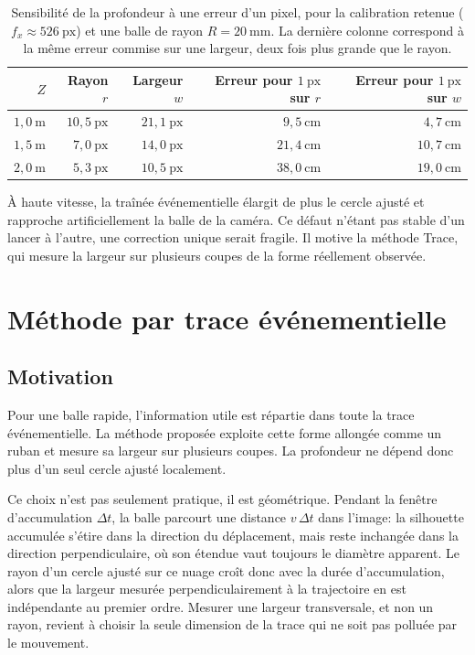 \documentclass[a4paper,11pt]{report}
\begin{document}
\begin{table}[H]
  \centering
  \caption{Sensibilité de la profondeur à une erreur d'un pixel, pour la calibration retenue (\(f_x \approx 526~\text{px}\)) et une balle de rayon \(R = 20~\text{mm}\). La dernière colonne correspond à la même erreur commise sur une largeur, deux fois plus grande que le rayon.}
  \label{tab:depth-sensitivity}
  \small
  \begin{tabular}{rrrrr}
    \toprule
    \(Z\) & Rayon \(r\) & Largeur \(w\) & Erreur pour \(1~\text{px}\) sur \(r\) & Erreur pour \(1~\text{px}\) sur \(w\) \\
    \midrule
    \(1{,}0~\text{m}\) & \(10{,}5~\text{px}\) & \(21{,}1~\text{px}\) & \(9{,}5~\text{cm}\) & \(4{,}7~\text{cm}\) \\
    \(1{,}5~\text{m}\) & \(7{,}0~\text{px}\) & \(14{,}0~\text{px}\) & \(21{,}4~\text{cm}\) & \(10{,}7~\text{cm}\) \\
    \(2{,}0~\text{m}\) & \(5{,}3~\text{px}\) & \(10{,}5~\text{px}\) & \(38{,}0~\text{cm}\) & \(19{,}0~\text{cm}\) \\
    \bottomrule
  \end{tabular}
\end{table}

À haute vitesse, la traînée événementielle élargit de plus le cercle ajusté et
rapproche artificiellement la balle de la caméra. Ce défaut n'étant pas stable
d'un lancer à l'autre, une correction unique serait fragile. Il motive la
méthode Trace, qui mesure la largeur sur plusieurs coupes de la forme réellement
observée.

\section{Méthode par trace événementielle}

\subsection{Motivation}

Pour une balle rapide, l'information utile est répartie dans toute la trace
événementielle. La méthode proposée exploite cette forme allongée comme un
ruban et mesure sa largeur sur plusieurs coupes. La profondeur ne dépend donc
plus d'un seul cercle ajusté localement.

Ce choix n'est pas seulement pratique, il est géométrique. Pendant la fenêtre
d'accumulation \(\Delta t\), la balle parcourt une distance \(v\,\Delta t\)
dans l'image: la silhouette accumulée s'étire dans la direction du déplacement,
mais reste inchangée dans la direction perpendiculaire, où son étendue vaut
toujours le diamètre apparent. Le rayon d'un cercle ajusté sur ce nuage croît
donc avec la durée d'accumulation, alors que la largeur mesurée
perpendiculairement à la trajectoire en est indépendante au premier ordre.
Mesurer une largeur transversale, et non un rayon, revient à choisir la seule
dimension de la trace qui ne soit pas polluée par le mouvement.
\end{document}
